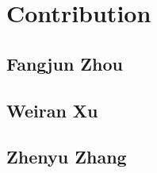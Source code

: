 \documentclass[12pt]{article}
\begin{document}
  \section{Contribution}

  \subsection{Fangjun Zhou}

  \subsection{Weiran Xu}

  \subsection{Zhenyu Zhang}
  
  

  \printbibliography
\end{document}
